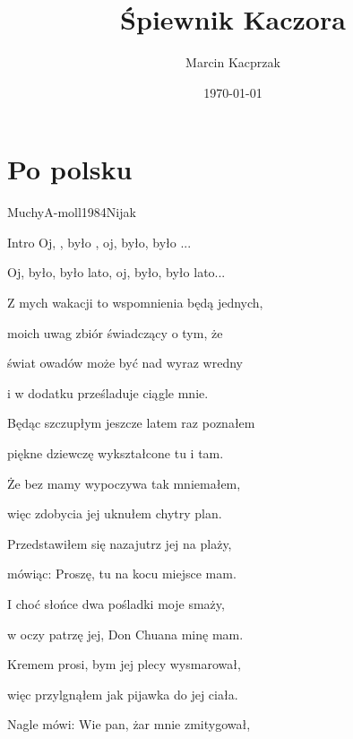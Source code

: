 \documentclass[a4paper,draft]{book}
\begin{document}

\title{\Huge Śpiewnik Kaczora}
\author{Marcin Kacprzak}
\date{\today}

\maketitle
\tableofcontents

\chapter{Po polsku}
\begin{song}{Muchy}{A-moll}{1984}{Nijak}{}{}
	
	\begin{SBBracket}{Intro}
	Oj, , było , oj, było, było ...

	Oj, było, było lato, oj, było, było lato...
	\end{SBBracket}

	\begin{SBVerse}
	Z mych wakacji to wspomnienia będą jednych,

	moich uwag zbiór świadczący o tym, że

	świat owadów może być nad wyraz wredny

	i w dodatku prześladuje ciągle mnie.
	\end{SBVerse}
	\begin{SBVerse}
	Będąc szczupłym jeszcze latem raz poznałem

	piękne dziewczę wykształcone tu i tam.

	Że bez mamy wypoczywa tak mniemałem,

	więc zdobycia jej uknułem chytry plan.
	\end{SBVerse}
	\begin{SBVerse}
	Przedstawiłem się nazajutrz jej na plaży,

	mówiąc: Proszę, tu na kocu miejsce mam.

	I choć słońce dwa pośladki moje smaży,

	w oczy patrzę jej, Don Chuana minę mam.
	\end{SBVerse}
	\begin{SBVerse}
	Kremem prosi, bym jej plecy wysmarował,

	więc przylgnąłem jak pijawka do jej ciała.

	Nagle mówi: Wie pan, żar mnie zmitygował,


\end{SBVerse}
\end{song}
\end{document}
